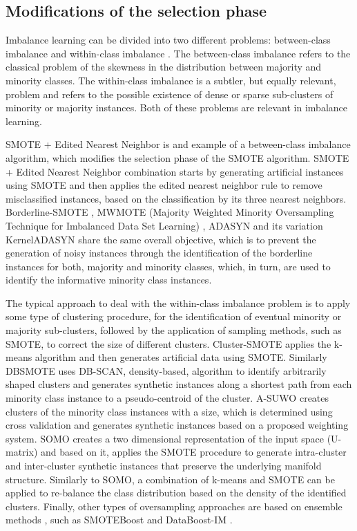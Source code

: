 \documentclass[parskip=full]{scrartcl}
\begin{document}
\subsection{Modifications of the selection phase}

Imbalance learning can be divided into two different problems: between-class imbalance and within-class imbalance \cite{Jo2004}. The between-class imbalance refers to the classical problem of the skewness in the distribution between majority and minority classes. The within-class imbalance is a subtler, but equally relevant, problem and refers to the possible existence of dense or sparse sub-clusters of minority or majority instances. Both of these problems are relevant in imbalance learning. 

SMOTE + Edited Nearest Neighbor \cite{Batista2004} is and example of a between-class imbalance algorithm, which modifies the selection phase of the SMOTE algorithm. SMOTE + Edited Nearest Neighbor combination starts by generating artificial instances using SMOTE and then applies the edited nearest neighbor rule \cite{Wilson1972} to remove misclassified instances, based on the classification by its three nearest neighbors. Borderline-SMOTE \cite{Han2005}, MWMOTE (Majority Weighted Minority Oversampling Technique for Imbalanced Data Set Learning) \cite{Barua2014}, ADASYN and its variation KernelADASYN \cite{Tang2015} share the same overall objective, which is to prevent the generation of noisy instances through the identification of the borderline instances for both, majority and minority classes, which, in turn, are used to identify the informative minority class instances. 

The typical approach to deal with the within-class imbalance  problem is to apply some type of clustering procedure, for the identification of eventual minority or majority sub-clusters, followed by the application of sampling methods, such as SMOTE, to correct the size of different clusters. Cluster-SMOTE \cite{Cieslak2006} applies the k-means algorithm and then generates artificial data using SMOTE. Similarly DBSMOTE \cite{Bunkhumpornpat2012} uses DB-SCAN, density-based, algorithm to identify arbitrarily shaped clusters and generates synthetic instances along a shortest path from each minority class instance to a pseudo-centroid of the cluster. A-SUWO \cite{Nekooeimehr2016} creates clusters of the minority class instances with a size, which is determined using cross validation and generates synthetic instances based on a proposed weighting system. SOMO \cite{Douzas2017a} creates a two dimensional representation of the input space (U-matrix) and based on it, applies the SMOTE procedure to generate intra-cluster and inter-cluster synthetic instances that preserve the underlying manifold structure. Similarly to SOMO, a combination of k-means and SMOTE \cite{Douzas2018} can be applied to re-balance the class distribution based on the density of the identified clusters. Finally, other types of oversampling approaches are based on ensemble methods  \cite{Wang2015}, \cite{Sun2015} such as SMOTEBoost \cite{Chawla2003} and DataBoost-IM \cite{Guo2004}. 
\end{document}
